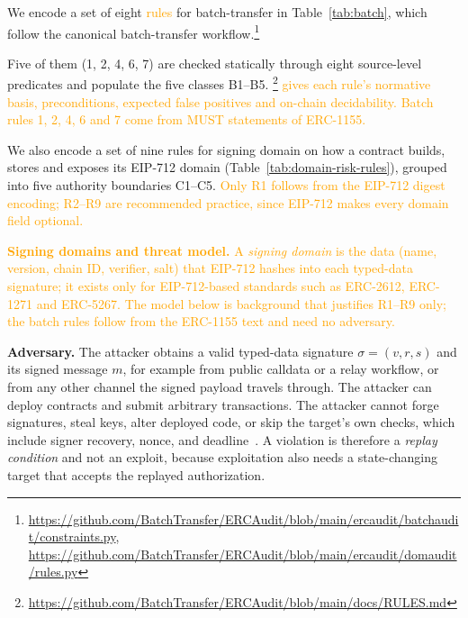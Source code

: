 \documentclass[10pt,conference]{IEEEtran}
\newcommand{\AS}[1]{\textcolor{orange}{#1}}
\newcommand{\gh}[1]{\footnote{\scriptsize\url{https://github.com/BatchTransfer/ERCAudit/blob/main/#1}}}
\newcommand{\ghtwo}[2]{\footnote{\scriptsize\url{https://github.com/BatchTransfer/ERCAudit/blob/main/#1}, \url{https://github.com/BatchTransfer/ERCAudit/blob/main/#2}}}
\begin{document}
We encode a set of eight \AS{rules} for batch-transfer in Table~\ref{tab:batch}, which follow the canonical batch-transfer workflow.\AS{\ghtwo{ercaudit/batchaudit/constraints.py}{ercaudit/domaudit/rules.py}}


Five of them (1, 2, 4, 6, 7) are checked statically through eight source-level predicates and
populate the five classes B1--B5. 
\AS{\gh{docs/RULES.md} gives each rule's normative basis, preconditions, expected false positives and on-chain decidability. Batch rules 1, 2, 4, 6 and 7 come from MUST statements of ERC-1155.}

We also encode a set of nine rules for signing domain on how a contract builds, stores and exposes its
EIP-712 domain (Table~\ref{tab:domain-risk-rules}), grouped into five authority boundaries C1--C5. 
\AS{Only R1 follows from the EIP-712 digest encoding; R2--R9 are recommended practice, since EIP-712 makes every domain field optional.}

\AS{\textbf{Signing domains and threat model.} A \emph{signing domain} is the data (name, version, chain ID, verifier, salt) that EIP-712 hashes into each typed-data signature; it exists only for EIP-712-based standards such as ERC-2612, ERC-1271 and ERC-5267. The model below is background that justifies R1--R9 only; the batch rules follow from the ERC-1155 text and need no adversary.}

\textbf{Adversary.} The attacker obtains a valid typed-data signature $\sigma=(v,r,s)$ and its signed message $m$, for example from public calldata or a relay workflow, or from any other channel the signed payload travels through. The attacker can deploy contracts and submit arbitrary transactions. The attacker cannot forge signatures, steal keys, alter deployed code, or skip the target's own checks, which include signer recovery, nonce, and deadline~\cite{meisami2025sigscope}. A violation is therefore a \emph{replay condition} and not an exploit, because exploitation also needs a state-changing target that accepts the replayed authorization.
\end{document}
